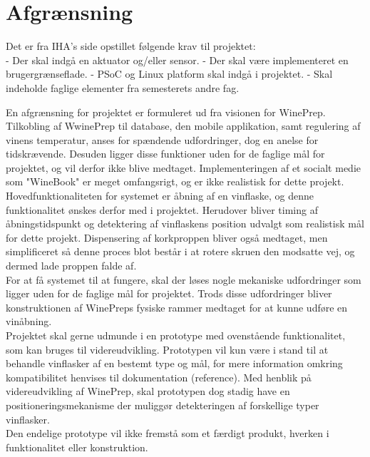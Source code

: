\chapter{Afgrænsning}
Det er fra IHA's side opstillet følgende krav til projektet:\\
- Der skal indgå en aktuator og/eller sensor.
- Der skal være implementeret en brugergrænseflade.
- PSoC og Linux platform skal indgå i projektet.
- Skal indeholde faglige elementer fra semesterets andre fag.

En afgrænsning for projektet er formuleret ud fra visionen for WinePrep. Tilkobling af WwinePrep til database, den mobile applikation, samt regulering af vinens temperatur, anses for spændende udfordringer, dog en anelse for tidskrævende. Desuden ligger disse funktioner uden for de faglige mål for projektet, og vil derfor ikke blive medtaget. Implementeringen af et socialt medie som "WineBook" er meget omfangsrigt, og er ikke realistisk for dette projekt.\\

Hovedfunktionaliteten for systemet er åbning af en vinflaske, og denne funktionalitet ønskes derfor med i projektet. Herudover bliver timing af åbningstidspunkt og detektering af vinflaskens position udvalgt som realistisk mål for dette projekt. Dispensering af korkproppen bliver også medtaget, men simplificeret så denne proces blot består i at rotere skruen den modsatte vej, og dermed lade proppen falde af.\\

For at få systemet til at fungere, skal der løses nogle mekaniske udfordringer som ligger uden for de faglige mål for projektet. Trods disse udfordringer bliver konstruktionen af WinePreps fysiske rammer medtaget for at kunne udføre en vinåbning.\\

Projektet skal gerne udmunde i en prototype med ovenstående funktionalitet, som kan bruges til videreudvikling. Prototypen vil kun være i stand til at behandle vinflasker af en bestemt type og mål, for mere information omkring kompatibilitet henvises til dokumentation (reference). Med henblik på videreudvikling af WinePrep, skal prototypen dog stadig have en positioneringsmekanisme der muliggør detekteringen af forskellige typer vinflasker.\\ 

Den endelige prototype vil ikke fremstå som et færdigt produkt, hverken i funktionalitet eller konstruktion. 

    